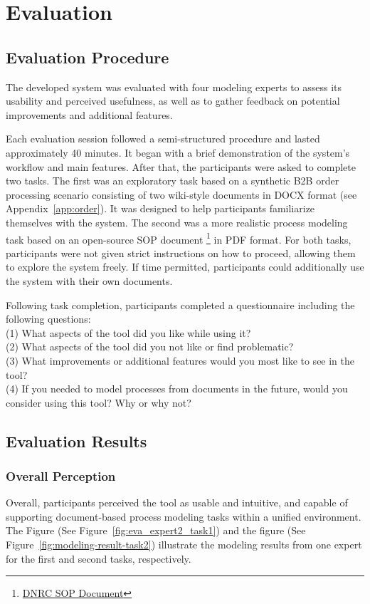 \chapter{Evaluation}
\label{sec:evaluation} 

\section{Evaluation Procedure}
The developed system was evaluated with four modeling experts to assess its usability and perceived usefulness, as well as to gather feedback on potential improvements and additional features.

Each evaluation session followed a semi-structured procedure and lasted approximately 40 minutes. It began with a brief demonstration of the system's workflow and main features. After that, the participants were asked to complete two tasks. The first was an exploratory task based on a synthetic B2B order processing scenario consisting of two wiki-style documents in DOCX format (see Appendix~\ref{app:order}). It was designed to help participants familiarize themselves with the system. The second was a more realistic process modeling task based on an open-source SOP document \footnote{\href{https://dnrc.mt.gov/_docs/forestry/Wildfire/agreements-plans-guides/DNRC-Manuals/300-Fire-Business-Manual/Appendix-300-Manual/2023_Fire_Contract_PMT_SOP.pdf}{DNRC SOP Document}} in PDF format. For both tasks, participants were not given strict instructions on how to proceed, allowing them to explore the system freely. If time permitted, participants could additionally use the system with their own documents. 

Following task completion, participants completed a questionnaire including the following questions: \\
(1) What aspects of the tool did you like while using it? \\
(2) What aspects of the tool did you not like or find problematic? \\
(3) What improvements or additional features would you most like to see in the tool? \\
(4) If you needed to model processes from documents in the future, would you consider using this tool? Why or why not?

\section{Evaluation Results}
\subsection{Overall Perception}
Overall, participants perceived the tool as usable and intuitive, and capable of supporting document-based process modeling tasks within a unified environment. The Figure (See Figure~\ref{fig:eva_expert2_task1}) and the figure (See Figure~\ref{fig:modeling-result-task2}) illustrate the modeling results from one expert for the first and second tasks, respectively. 

